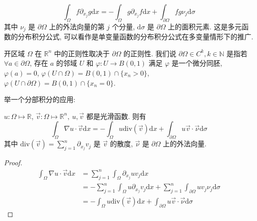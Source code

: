\documentclass[11pt]{ctexart}[UTF8]
\begin{document}
\begin{equation}
    \int_{\Omega} f \partial_{x_j} g \mathrm{d}x = - \int_{\Omega} g \partial_{x_j} f \mathrm{d}x + \int_{\partial \Omega} f g \nu_j \mathrm{d}\sigma
\end{equation}
其中 $\nu_j$ 是 $\partial \Omega$ 上的外法向量的第 $j$ 个分量, $\mathrm{d}\sigma$ 是 $\partial \Omega$ 上的面积元素. 这是多元函数的分布积分公式, 可以看作是单变量函数的分布积分公式在多变量情形下的推广.\par
开区域 $\Omega$ 在 $\mathbb{R}^n$ 中的正则性取决于 $\partial \Omega$ 的正则性. 我们说 $\partial \Omega \in C^{k}, k\in \mathbb{N}$ 是指若 $\forall a \in \partial \Omega$, 
存在 $a$ 的邻域 $U$ 和 $\varphi: U \to B(0,1)$ 满足 $\varphi$ 是一个微分同胚, $\varphi(a) = 0$, $\varphi(U \cap \Omega) = B(0,1) \cap \{ x_n > 0 \}$, $\varphi(U \cap \partial \Omega) = B(0,1) \cap \{ x_n = 0 \}$.
\par
举一个分部积分的应用:
\begin{example}
    $u: \Omega \mapsto \mathbb{R}$, $\overrightarrow{v}: \Omega \mapsto \mathbb{R}^n,\ u, \overrightarrow{v}$ 都是光滑函数. 则有
\begin{equation*}
    \int_{\Omega} \nabla u \cdot \overrightarrow{v} \mathrm{d}x = - \int_{\Omega} u \mathrm{div}(\overrightarrow{v}) \mathrm{d}x + \int_{\partial \Omega} u \overrightarrow{v} \cdot \overrightarrow{\nu} \mathrm{d}\sigma
\end{equation*}
其中 $\mathrm{div}(\overrightarrow{v}) = \sum\limits_{j=1}^n \partial_{x_j} v_j$ 是 $\overrightarrow{v}$ 的散度, $\overrightarrow{\nu}$ 是 $\partial \Omega$ 上的外法向量.
\end{example}
\begin{proof}
    \begin{equation*}
        \begin{aligned}
            \int_{\Omega} \nabla u \cdot \overrightarrow{v} \mathrm{d}x & = \sum\limits_{j=1}^n \int_{\Omega} \partial_{x_j} u v_j \mathrm{d}x \\
            & = - \sum\limits_{j=1}^n \int_{\Omega} u \partial_{x_j} v_j \mathrm{d}x + \sum\limits_{j=1}^n \int_{\partial \Omega} u v_j \nu_j \mathrm{d}\sigma \\
            & = -\int_{\Omega} u \text{div}(\overrightarrow{v}) \mathrm{d}x + \int_{\partial \Omega} u \overrightarrow{v} \cdot \overrightarrow{\nu} \mathrm{d}\sigma
        \end{aligned}
    \end{equation*}
\end{proof}
\end{document}
